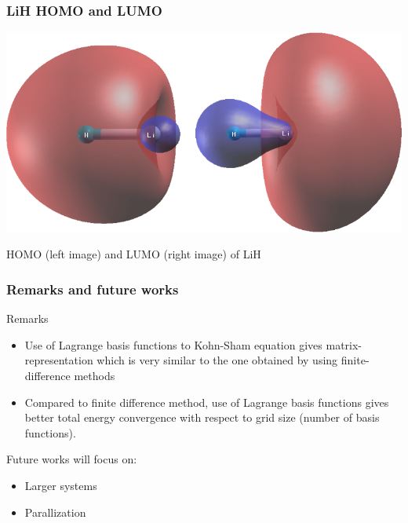 \documentclass[10pt,t]{beamer}
\begin{document}
\begin{frame}[c]
\frametitle{LiH HOMO and LUMO}

{\centering
\includegraphics[scale=0.45]{images/LiH_HOMO_LUMO.png}
\par
HOMO (left image) and LUMO (right image) of LiH
\par}



\end{frame}

\begin{frame}[c]
\frametitle{Remarks and future works}

Remarks
\begin{itemize}
\item Use of Lagrange basis functions to Kohn-Sham equation gives
matrix-representation which is very similar to the one obtained by
using finite-difference methods
\item Compared to finite difference method, use of Lagrange basis functions
gives better total energy convergence with respect to grid size (number of basis
functions).
\end{itemize}

Future works will focus on:
\begin{itemize}
\item Larger systems
\item Parallization
\end{itemize}

\end{frame}
\end{document}
